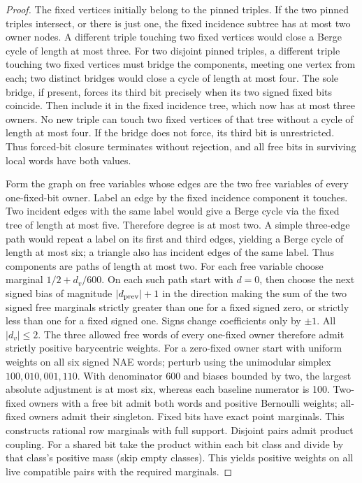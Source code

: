\documentclass[11pt]{article}
\begin{document}
\begin{proof}
The fixed vertices initially belong to the pinned triples. If the two pinned triples intersect, or there is just one, the fixed incidence subtree has at most two owner nodes. A different triple touching two fixed vertices would close a Berge cycle of length at most three. For two disjoint pinned triples, a different triple touching two fixed vertices must bridge the components, meeting one vertex from each; two distinct bridges would close a cycle of length at most four. The sole bridge, if present, forces its third bit precisely when its two signed fixed bits coincide. Then include it in the fixed incidence tree, which now has at most three owners. No new triple can touch two fixed vertices of that tree without a cycle of length at most four. If the bridge does not force, its third bit is unrestricted. Thus forced-bit closure terminates without rejection, and all free bits in surviving local words have both values.

Form the graph on free variables whose edges are the two free variables of every one-fixed-bit owner. Label an edge by the fixed incidence component it touches. Two incident edges with the same label would give a Berge cycle via the fixed tree of length at most five. Therefore degree is at most two. A simple three-edge path would repeat a label on its first and third edges, yielding a Berge cycle of length at most six; a triangle also has incident edges of the same label. Thus components are paths of length at most two. For each free variable choose marginal $1/2+d_v/600$. On each such path start with $d=0$, then choose the next signed bias of magnitude $|d_{\rm prev}|+1$ in the direction making the sum of the two signed free marginals strictly greater than one for a fixed signed zero, or strictly less than one for a fixed signed one. Signs change coefficients only by $\pm1$. All $|d_v|\le2$. The three allowed free words of every one-fixed owner therefore admit strictly positive barycentric weights. For a zero-fixed owner start with uniform weights on all six signed NAE words; perturb using the unimodular simplex $100,010,001,110$. With denominator 600 and biases bounded by two, the largest absolute adjustment is at most six, whereas each baseline numerator is 100. Two-fixed owners with a free bit admit both words and positive Bernoulli weights; all-fixed owners admit their singleton. Fixed bits have exact point marginals. This constructs rational row marginals with full support. Disjoint pairs admit product coupling. For a shared bit take the product within each bit class and divide by that class's positive mass (skip empty classes). This yields positive weights on all live compatible pairs with the required marginals.


\end{proof}
\end{document}
